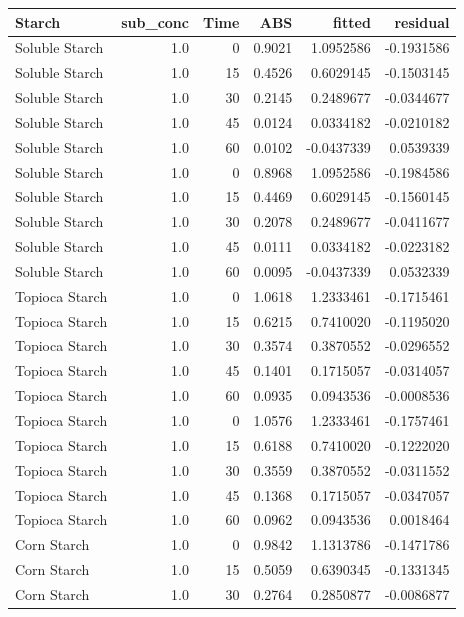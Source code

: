 \documentclass[
  12pt,
]{article}
\newcounter{none} %
\begin{document}
{\def\LTcaptype{none} %
\begin{longtable}[]{@{}lrrrrr@{}}
\toprule\noalign{}
Starch & sub\_conc & Time & ABS & fitted & residual \\
\midrule\noalign{}
\endhead
\bottomrule\noalign{}
\endlastfoot
Soluble Starch & 1.0 & 0 & 0.9021 & 1.0952586 & -0.1931586 \\
Soluble Starch & 1.0 & 15 & 0.4526 & 0.6029145 & -0.1503145 \\
Soluble Starch & 1.0 & 30 & 0.2145 & 0.2489677 & -0.0344677 \\
Soluble Starch & 1.0 & 45 & 0.0124 & 0.0334182 & -0.0210182 \\
Soluble Starch & 1.0 & 60 & 0.0102 & -0.0437339 & 0.0539339 \\
Soluble Starch & 1.0 & 0 & 0.8968 & 1.0952586 & -0.1984586 \\
Soluble Starch & 1.0 & 15 & 0.4469 & 0.6029145 & -0.1560145 \\
Soluble Starch & 1.0 & 30 & 0.2078 & 0.2489677 & -0.0411677 \\
Soluble Starch & 1.0 & 45 & 0.0111 & 0.0334182 & -0.0223182 \\
Soluble Starch & 1.0 & 60 & 0.0095 & -0.0437339 & 0.0532339 \\
Topioca Starch & 1.0 & 0 & 1.0618 & 1.2333461 & -0.1715461 \\
Topioca Starch & 1.0 & 15 & 0.6215 & 0.7410020 & -0.1195020 \\
Topioca Starch & 1.0 & 30 & 0.3574 & 0.3870552 & -0.0296552 \\
Topioca Starch & 1.0 & 45 & 0.1401 & 0.1715057 & -0.0314057 \\
Topioca Starch & 1.0 & 60 & 0.0935 & 0.0943536 & -0.0008536 \\
Topioca Starch & 1.0 & 0 & 1.0576 & 1.2333461 & -0.1757461 \\
Topioca Starch & 1.0 & 15 & 0.6188 & 0.7410020 & -0.1222020 \\
Topioca Starch & 1.0 & 30 & 0.3559 & 0.3870552 & -0.0311552 \\
Topioca Starch & 1.0 & 45 & 0.1368 & 0.1715057 & -0.0347057 \\
Topioca Starch & 1.0 & 60 & 0.0962 & 0.0943536 & 0.0018464 \\
Corn Starch & 1.0 & 0 & 0.9842 & 1.1313786 & -0.1471786 \\
Corn Starch & 1.0 & 15 & 0.5059 & 0.6390345 & -0.1331345 \\
Corn Starch & 1.0 & 30 & 0.2764 & 0.2850877 & -0.0086877 \\

\end{longtable}}
\end{document}
